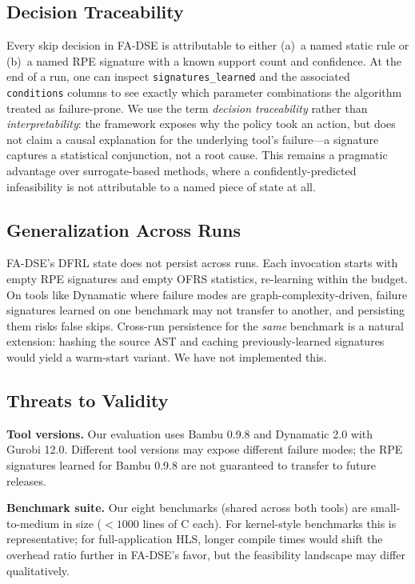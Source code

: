 \documentclass[journal]{IEEEtran}
\begin{document}
\subsection{Decision Traceability}

Every skip decision in FA-DSE is attributable to either (a)~a named static rule or (b)~a named RPE signature with a known support count and confidence. At the end of a run, one can inspect \texttt{signatures\_learned} and the associated \texttt{conditions} columns to see exactly which parameter combinations the algorithm treated as failure-prone. We use the term \emph{decision traceability} rather than \emph{interpretability}: the framework exposes why the policy took an action, but does not claim a causal explanation for the underlying tool's failure---a signature captures a statistical conjunction, not a root cause. This remains a pragmatic advantage over surrogate-based methods, where a confidently-predicted infeasibility is not attributable to a named piece of state at all.

\subsection{Generalization Across Runs}

FA-DSE's DFRL state does not persist across runs. Each invocation starts with empty RPE signatures and empty OFRS statistics, re-learning within the budget. On tools like Dynamatic where failure modes are graph-complexity-driven, failure signatures learned on one benchmark may not transfer to another, and persisting them risks false skips. Cross-run persistence for the \emph{same} benchmark is a natural extension: hashing the source AST and caching previously-learned signatures would yield a warm-start variant. We have not implemented this.

\subsection{Threats to Validity}

\textbf{Tool versions.} Our evaluation uses Bambu 0.9.8 and Dynamatic 2.0 with Gurobi 12.0. Different tool versions may expose different failure modes; the RPE signatures learned for Bambu 0.9.8 are not guaranteed to transfer to future releases.

\textbf{Benchmark suite.} Our eight benchmarks (shared across both tools) are small-to-medium in size ($< 1000$ lines of C each). For kernel-style benchmarks this is representative; for full-application HLS, longer compile times would shift the overhead ratio further in FA-DSE's favor, but the feasibility landscape may differ qualitatively.
\end{document}
